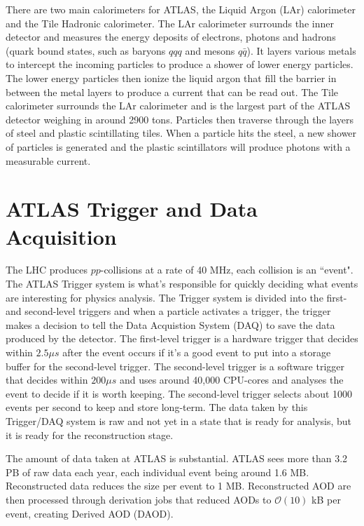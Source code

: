There are two main calorimeters for ATLAS, the Liquid Argon (LAr) calorimeter and the Tile Hadronic calorimeter.
The LAr calorimeter surrounds the inner detector and measures the energy deposits of electrons, photons and hadrons (quark bound states, such as baryons $qqq$ and mesons $q\bar{q}$). 
It layers various metals to intercept the incoming particles to produce a shower of lower energy particles. 
The lower energy particles then ionize the liquid argon that fill the barrier in between the metal layers to produce a current that can be read out.
The Tile calorimeter surrounds the LAr calorimeter and is the largest part of the ATLAS detector weighing in around 2900 tons. 
Particles then traverse through the layers of steel and plastic scintillating tiles. 
When a particle hits the steel, a new shower of particles is generated and the plastic scintillators will produce photons with a measurable current.

\section{ATLAS Trigger and Data Acquisition}

The LHC produces $pp$-collisions at a rate of 40 MHz, each collision is an ``event". 
The ATLAS Trigger system is what's responsible for quickly deciding what events are interesting for physics analysis.
The Trigger system is divided into the first- and second-level triggers and when a particle activates a trigger, the trigger makes a decision to tell the Data Acquistion System (DAQ) to save the data produced by the detector. 
The first-level trigger is a hardware trigger that decides within $2.5 \mu s$ after the event occurs if it's a good event to put into a storage buffer for the second-level trigger.
The second-level trigger is a software trigger that decides within $200 \mu s$ and uses around 40,000 CPU-cores and analyses the event to decide if it is worth keeping. 
The second-level trigger selects about 1000 events per second to keep and store long-term. \cite{Trigger-DAQ}
The data taken by this Trigger/DAQ system is raw and not yet in a state that is ready for analysis, but it is ready for the reconstruction stage. 

The amount of data taken at ATLAS is substantial.
ATLAS sees more than 3.2 PB of raw data each year, each individual event being around 1.6 MB. \cite{ATLAS_Fact_Sheet} 
Reconstructed data reduces the size per event to 1 MB. 
Reconstructed AOD are then processed through derivation jobs that reduced AODs to $\mathcal{O}(10)$ kB per event, creating Derived AOD (DAOD). 